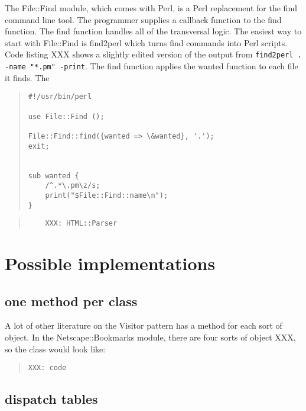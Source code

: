The File::Find module, which comes with Perl, is a Perl
replacement for the find command line tool.  The
programmer supplies a callback function to the find
function.  The find function handles all of the 
transversal logic.  The easiest way to start with
File::Find is find2perl which turns find commands into
Perl scripts.  Code listing XXX shows a slightly edited
version of the output from \texttt{find2perl . -name "*.pm" -print}.
The find function applies the wanted function to each
file it finds.  The 

\begin{quote}    
\begin{verbatim}
#!/usr/bin/perl

use File::Find ();

File::Find::find({wanted => \&wanted}, '.');
exit;


sub wanted {
    /^.*\.pm\z/s;
    print("$File::Find::name\n");
}
\end{verbatim}
\end{quote}    
	
\begin{quote}    
\begin{verbatim}
	XXX: HTML::Parser
\end{verbatim}
\end{quote}    

	\section{Possible implementations}
	
	\subsection{one method per class}

A lot of other literature on the Visitor pattern has a
method for each sort of object.  In the Netscape::Bookmarks
module, there are four sorts of object XXX, so the class
would look like:

\begin{quote}    
\begin{verbatim}
XXX: code
\end{verbatim}
\end{quote}    


	
	\subsection{dispatch tables}


